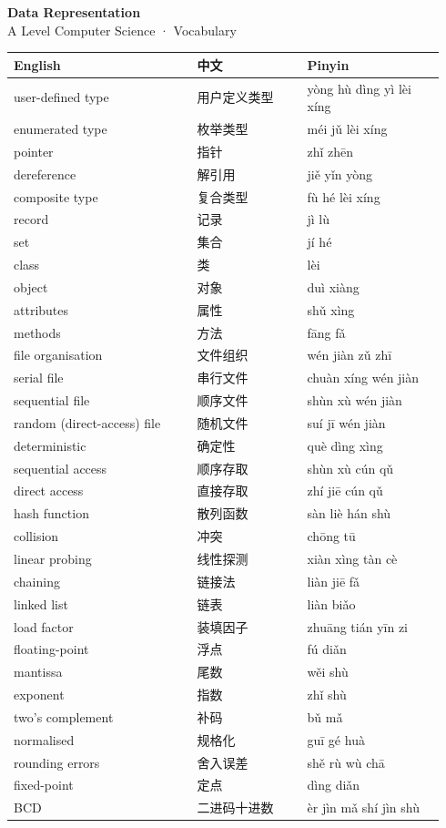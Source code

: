 \documentclass[11pt]{article}
\begin{document}
\begin{center}
  {\LARGE\bfseries Data Representation}\\[0.35em]
  {\large A Level Computer Science · Vocabulary}
\end{center}
\vspace{0.6em}

\begin{longtable}{@{}p{0.40\linewidth}p{0.24\linewidth}p{0.30\linewidth}@{}}
\toprule
\textbf{English} & \textbf{中文} & \textbf{Pinyin} \\
\midrule
\endhead
\bottomrule
\endlastfoot
user-defined type & 用户定义类型 & yòng hù dìng yì lèi xíng \\
enumerated type & 枚举类型 & méi jǔ lèi xíng \\
pointer & 指针 & zhǐ zhēn \\
dereference & 解引用 & jiě yǐn yòng \\
composite type & 复合类型 & fù hé lèi xíng \\
record & 记录 & jì lù \\
set & 集合 & jí hé \\
class & 类 & lèi \\
object & 对象 & duì xiàng \\
attributes & 属性 & shǔ xìng \\
methods & 方法 & fāng fǎ \\
file organisation & 文件组织 & wén jiàn zǔ zhī \\
serial file & 串行文件 & chuàn xíng wén jiàn \\
sequential file & 顺序文件 & shùn xù wén jiàn \\
random (direct-access) file & 随机文件 & suí jī wén jiàn \\
deterministic & 确定性 & què dìng xìng \\
sequential access & 顺序存取 & shùn xù cún qǔ \\
direct access & 直接存取 & zhí jiē cún qǔ \\
hash function & 散列函数 & sàn liè hán shù \\
collision & 冲突 & chōng tū \\
linear probing & 线性探测 & xiàn xìng tàn cè \\
chaining & 链接法 & liàn jiē fǎ \\
linked list & 链表 & liàn biǎo \\
load factor & 装填因子 & zhuāng tián yīn zi \\
floating-point & 浮点 & fú diǎn \\
mantissa & 尾数 & wěi shù \\
exponent & 指数 & zhǐ shù \\
two's complement & 补码 & bǔ mǎ \\
normalised & 规格化 & guī gé huà \\
rounding errors & 舍入误差 & shě rù wù chā \\
fixed-point & 定点 & dìng diǎn \\
BCD & 二进码十进数 & èr jìn mǎ shí jìn shù \\
\end{longtable}
\end{document}
